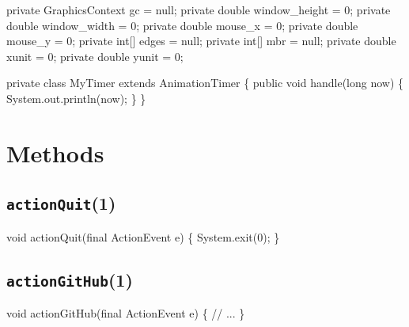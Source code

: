 \nwenddocs{}\plusendmoddef
private GraphicsContext gc = null;
private double window_height = 0;
private double window_width = 0;
private double mouse_x = 0;
private double mouse_y = 0;
private int[] edges = null;
private int[] mbr = null;
private double xunit = 0;
private double yunit = 0;
\nwendcode{}\nwdocspar

\nwenddocs{}\plusendmoddef
private class MyTimer extends AnimationTimer \{
  public void handle(long now) \{
    System.out.println(now);
  \}
\}
\nwendcode{}\nwdocspar

\section{Methods}

\subsection{\texttt{actionQuit}(1)}
\nwenddocs{}\endmoddef{}
void actionQuit(final ActionEvent e) \{
  System.exit(0);
\}
\eatline
{}\nwendcode{}\nwdocspar
\subsection{\texttt{actionGitHub}(1)}
\nwenddocs{}\endmoddef{}
void actionGitHub(final ActionEvent e) \{
  // ...
\}
\eatline
{}\nwendcode{}\nwdocspar
